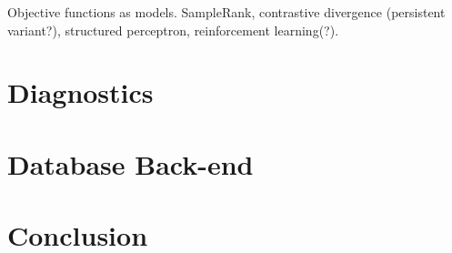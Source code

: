 \documentclass[]{manual}
\begin{document}
Objective functions as models. SampleRank, contrastive divergence (persistent variant?), structured perceptron, reinforcement learning(?).


\chapter{Diagnostics}
\label{chap:diagnostics}

\chapter{Database Back-end}
\label{chap:database}

\chapter{Conclusion}
\label{chap:conclusion}





\end{document}

